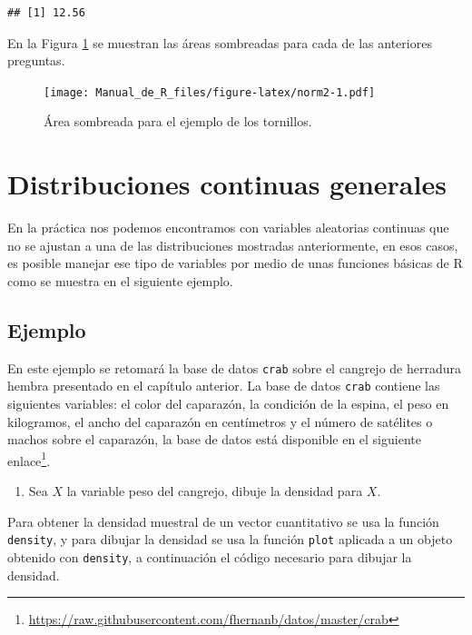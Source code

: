 \documentclass[10pt,]{krantz}
\providecommand{\tightlist}{%
  \setlength{\itemsep}{0pt}\setlength{\parskip}{0pt}}
\let\proglang=\textsf
\renewcommand{\href}[2]{#2\footnote{\url{#1}}}
\begin{document}
\begin{verbatim}
## [1] 12.56
\end{verbatim}

En la Figura \ref{fig:norm2} se muestran las áreas sombreadas para cada
de las anteriores preguntas.

\begin{figure}[htbp]
\centering
\texttt{[image: Manual\_de\_R\_files/figure-latex/norm2-1.pdf]}
\caption{\label{fig:norm2}Área sombreada para el ejemplo de los tornillos.}
\end{figure}

\section{Distribuciones continuas
generales}\label{distribuciones-continuas-generales}

En la práctica nos podemos encontramos con variables aleatorias
continuas que no se ajustan a una de las distribuciones mostradas
anteriormente, en esos casos, es posible manejar ese tipo de variables
por medio de unas funciones básicas de \proglang{R} como se muestra en
el siguiente ejemplo.

\subsection*{Ejemplo}\label{ejemplo-43}


En este ejemplo se retomará la base de datos \texttt{crab} sobre el
cangrejo de herradura hembra presentado en el capítulo anterior. La base
de datos \texttt{crab} contiene las siguientes variables: el color del
caparazón, la condición de la espina, el peso en kilogramos, el ancho
del caparazón en centímetros y el número de satélites o machos sobre el
caparazón, la base de datos está disponible en el siguiente
\href{https://raw.githubusercontent.com/fhernanb/datos/master/crab}{enlace}.

\begin{enumerate}
\def\labelenumi{\arabic{enumi})}
\tightlist
\item
  Sea \(X\) la variable peso del cangrejo, dibuje la densidad para
  \(X\).
\end{enumerate}

Para obtener la densidad muestral de un vector cuantitativo se usa la
función \texttt{density}, y para dibujar la densidad se usa la función
\texttt{plot} aplicada a un objeto obtenido con \texttt{density}, a
continuación el código necesario para dibujar la densidad.
\end{document}
